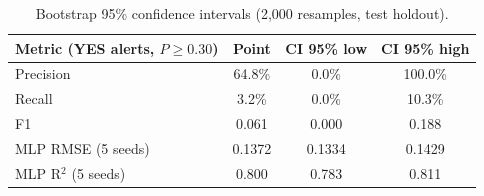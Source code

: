 \begin{table}[htbp]
\centering
\caption{Bootstrap 95\% confidence intervals (2{,}000 resamples, test holdout).}
\label{tab:bootstrap-ci}
\small
\begin{tabular}{@{}lccc@{}}
\toprule
\textbf{Metric (YES alerts, $P\geq 0.30$)} & \textbf{Point} & \textbf{CI 95\% low} & \textbf{CI 95\% high} \\
\midrule
Precision & 64.8\% & 0.0\% & 100.0\% \\
Recall & 3.2\% & 0.0\% & 10.3\% \\
F1 & 0.061 & 0.000 & 0.188 \\
\midrule
MLP RMSE (5 seeds) & 0.1372 & 0.1334 & 0.1429 \\
MLP R$^2$ (5 seeds) & 0.800 & 0.783 & 0.811 \\
\bottomrule
\end{tabular}
\end{table}
